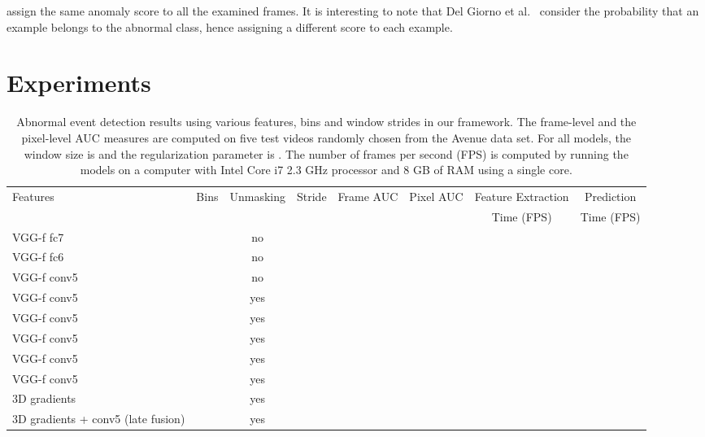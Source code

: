 \documentclass[10pt,twocolumn,letterpaper]{article}
\begin{document}
assign the same anomaly score to all the examined frames. It is interesting to note that Del Giorno et al.~\cite{Giorno-ECCV-2016} consider the probability that an example belongs to the abnormal class, hence assigning a different score to each example.

\vspace*{-0.2cm}
\section{Experiments}
\label{sec_Experiments}

\begin{table*}[t]
\small{
\begin{center}
\begin{tabular}{|l|c|c|c|c|c|r|r|}
\hline
Features 			& Bins 					& Unmasking 	& Stride     	& Frame AUC    	& Pixel AUC 	& Feature Extraction 	& \multicolumn{1}{|c|}{Prediction} \\
			 			& 		 					& 					 	& 			     	& 					     	& 					& \multicolumn{1}{|c|}{Time (FPS)}			& Time (FPS)\\
\hline
\hline


VGG-f fc7			&  	& no 				& 			& 			&  			&			& \\

VGG-f fc6			&  	& no 				& 			& 			&  			&			& \\

VGG-f conv5		&  	& no 				& 			& 			&  			& 		& \\

VGG-f conv5		&  	& yes 				& 			& 			&  			&			& \\

VGG-f conv5		&  	& yes 				&     	 	& 			&  			&			& \\

VGG-f conv5		&  	& yes 				& 			& 			&  			&			&	\\

VGG-f conv5		&  	& yes 				& 			& 			&  			&			& \\

VGG-f conv5		&  	& yes 				& 		& 			&  			&			& \\
\hline
3D gradients	&  	& yes 				& 			& 			&  			&		& \\

3D gradients + conv5 (late fusion)	&  & yes & 	& 			&  			&			& \\
\hline
\end{tabular}
\end{center}
}
\vspace*{-0.1cm}
\caption{Abnormal event detection results using various features, bins and window strides in our framework. The frame-level and the pixel-level AUC measures are computed on five test videos randomly chosen from the Avenue data set. For all models, the window size is  and the regularization parameter is . The number of frames per second (FPS) is computed by running the models on a computer with Intel Core i7 2.3 GHz processor and 8 GB of RAM using a single core.}
\label{tab_prelim_results}
\vspace*{-0.5cm}
\end{table*}
\end{document}

